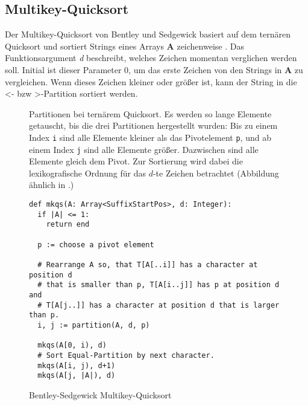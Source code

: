 \subsection{Multikey-Quicksort}
\label{section:mkqs}
Der  Multikey-Quicksort von Bentley und Sedgewick basiert auf dem ternären Quicksort und sortiert Strings eines Arrays \textbf{A} zeichenweise \cite{multikey_quicksort}. Das Funktionsargument \textit{d} beschreibt, welches Zeichen momentan verglichen werden soll. Initial ist dieser Parameter 0, um das erste Zeichen von den Strings in \textbf{A} zu vergleichen.
Wenn dieses Zeichen kleiner oder größer ist, kann der String in die \glqq <\grqq- bzw \glqq >\grqq-Partition sortiert werden.

\begin{figure}
	\centering
	\caption[Partitionen bei ternärem Quicksort]{Partitionen bei ternärem Quicksort. Es werden so lange Elemente getauscht, bis die drei Partitionen hergestellt wurden: Bis zu einem Index \texttt{i} sind alle Elemente kleiner als das Pivotelement \texttt{p}, und ab einem Index \texttt{j} sind alle Elemente größer. Dazwischen sind alle Elemente gleich dem Pivot. Zur Sortierung wird dabei die lexikografische Ordnung für das $d$-te Zeichen betrachtet (Abbildung ähnlich in \cite{ternary_quicksort}.)}
	\label{fg:ternary_partitions}
\end{figure}
%
\begin{figure}
	\begin{verbatim}
def mkqs(A: Array<SuffixStartPos>, d: Integer):
  if |A| <= 1:
    return end

  p := choose a pivot element

  # Rearrange A so, that T[A[..i]] has a character at position d
  # that is smaller than p, T[A[i..j]] has p at position d and 
  # T[A[j..]] has a character at position d that is larger than p.
  i, j := partition(A, d, p)

  mkqs(A[0, i), d)
  # Sort Equal-Partition by next character.
  mkqs(A[i, j), d+1)
  mkqs(A[j, |A|), d)
	\end{verbatim}
	\caption{Bentley-Sedgewick Multikey-Quicksort~\cite{multikey_quicksort}}
	\label{alg:mkqs}
\end{figure}

